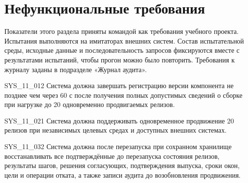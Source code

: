 \documentclass{tpks}
\begin{document}
\section{Нефункциональные требования}\label{sec:nonfunctional}

Показатели этого раздела приняты командой как требования учебного проекта.
Испытания выполняются на имитаторах внешних систем. Состав испытательной среды,
исходные данные и последовательность запросов фиксируются вместе с результатами
испытаний, чтобы прогон можно было повторить. Требования к журналу заданы в подразделе «Журнал аудита».

\begin{req}{SYS_11_01}{2}
Система должна завершать регистрацию версии компонента не позднее чем через 60 с после получения полных допустимых сведений о сборке при нагрузке до 20 одновременно продвигаемых релизов.
\end{req}

\begin{req}{SYS_11_02}{1}
Система должна поддерживать одновременное продвижение 20 релизов при независимых целевых средах и доступных внешних системах.
\end{req}

\begin{req}{SYS_11_03}{2}
Система должна после перезапуска при сохранном хранилище восстанавливать все подтверждённые до перезапуска состояния релизов, результаты шагов, решения согласующих, подтверждения выпуска, сроки окон, цели и операции отката,
а также записи аудита до возобновления продвижения.
\end{req}
\end{document}
